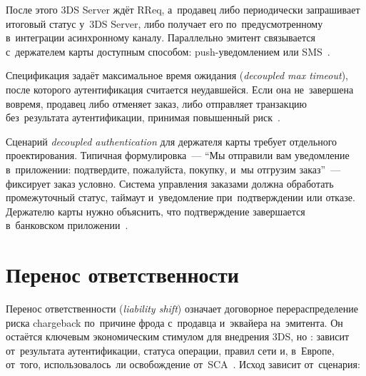 После этого 3DS Server ждёт RReq, а~продавец либо периодически запрашивает
итоговый статус у~3DS Server, либо получает его по~предусмотренному в~интеграции
асинхронному каналу. Параллельно эмитент
связывается с~держателем карты доступным способом: push-уведомлением или
SMS~\cite{emvco-3ds-decoupled}.

Спецификация задаёт максимальное время ожидания (\textit{decoupled max
timeout}), после которого аутентификация считается неудавшейся. Если она
не~завершена вовремя, продавец либо отменяет заказ, либо отправляет транзакцию
без~результата аутентификации, принимая повышенный
риск~\cite{emvco-3ds-decoupled}.

Сценарий \textit{decoupled authentication} для держателя карты требует отдельного
проектирования. Типичная формулировка~--- \enquote{Мы отправили вам уведомление
в~приложении: подтвердите, пожалуйста, покупку, и~мы отгрузим заказ}~---
фиксирует заказ условно. Система управления заказами должна
обработать промежуточный статус, таймаут и~уведомление при~подтверждении или
отказе. Держателю карты нужно объяснить, что подтверждение завершается
в~банковском приложении~\cite{emvco-3ds-decoupled}.

\section{Перенос ответственности}\label{sec:3ds-liability}

Перенос ответственности (\textit{liability shift}) означает договорное
перераспределение риска chargeback по~причине фрода с~продавца и~эквайера
на~эмитента. Он остаётся ключевым экономическим стимулом для внедрения 3DS, но
: зависит от~результата аутентификации,
статуса операции, правил сети и, в~Европе, от~того, использовалось~ли
освобождение от~SCA~\cite{visa-core-rules}. Исход зависит от~сценария:

